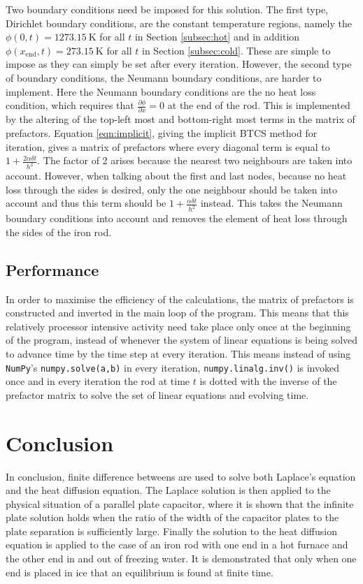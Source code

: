 Two boundary conditions need be imposed for this solution. The first type, Dirichlet boundary conditions, are the constant temperature regions, namely the $\phi(0,t)=\SI{1273.15}{\kelvin}$ for all $t$ in Section \ref{subsec:hot} and in addition $\phi(x_{\text{end}},t)=\SI{273.15}{\kelvin}$ for all $t$ in Section \ref{subsec:cold}. These are simple to impose as they can simply be set after every iteration. However, the second type of boundary conditions, the Neumann boundary conditions, are harder to implement. Here the Neumann boundary conditions are the no heat loss condition, which requires that $\frac{\partial \phi}{\partial x} = 0$ at the end of the rod. This is implemented by the altering of the top-left most and bottom-right most terms in the matrix of prefactors. Equation \ref{eqn:implicit}, giving the implicit BTCS method for iteration, gives a matrix of prefactors where every diagonal term is equal to $1+\frac{2\alpha\delta t}{h^2}$. The factor of 2 arises because the nearest two neighbours are taken into account. However, when talking about the first and last nodes, because no heat loss through the sides is desired, only the one neighbour should be taken into account and thus this term should be $1+\frac{\alpha\delta t}{h^2}$ instead. This takes the Neumann boundary conditions into account and removes the element of heat loss through the sides of the iron rod.

\subsection{Performance}
\label{subsec:performance}

In order to maximise the efficiency of the calculations, the matrix of prefactors is constructed and inverted in the main loop of the program. This means that this relatively processor intensive activity need take place only once at the beginning of the program, instead of whenever the system of linear equations is being solved to advance time by the time step at every iteration. This means instead of using \texttt{NumPy}'s \texttt{numpy.solve(a,b)} in every iteration, \texttt{numpy.linalg.inv()} is invoked once and in every iteration the rod at time $t$ is dotted with the inverse of the prefactor matrix to solve the set of linear equations and evolving time.

\section{Conclusion}
\label{sec:conclusion}

In conclusion, finite difference betweens are used to solve both Laplace's equation and the heat diffusion equation. The Laplace solution is then applied to the physical situation of a parallel plate capacitor, where it is shown that the infinite plate solution holds when the ratio of the width of the capacitor plates to the plate separation is sufficiently large. Finally the solution to the heat diffusion equation is applied to the case of an iron rod with one end in a hot furnace and the other end in and out of freezing water. It is demonstrated that only when one end is placed in ice that an equilibrium is found at finite time.